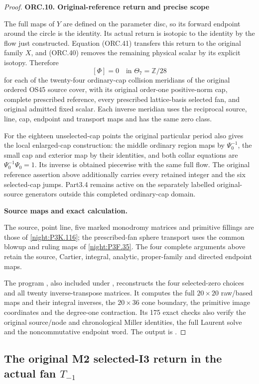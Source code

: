 \begin{proof}
\par

\medskip\noindent\textbf{ORC.10. Original-reference return and precise scope}

\par\nobreak

The full maps of \(Y\) are defined on the parameter
disc, so its forward endpoint around the circle is
the identity. Its actual return is isotopic to the
identity by the flow just constructed.
Equation (ORC.41) transfers this return to the original
family \(X\), and (ORC.40) removes the remaining
physical scalar by its explicit isotopy. Therefore
\[
[\Phi]=0\quad\text{in }\Theta_7=\mathbb Z/28
\tag{ORC.43}
\]
for each of the twenty-four ordinary-cap collision
meridians of the original ordered OS45 source cover,
with its original order-one positive-norm cap, complete
prescribed reference, every prescribed lattice-basis
selected fan, and original admitted fixed scalar.
Each inverse meridian uses the reciprocal source,
line, cap, endpoint and transport maps and has the
same zero class.

For the eighteen unselected-cap points the original
particular period also gives the local enlarged-cap
construction: the middle ordinary region maps by
\(\Psi_0^{-1}\), the small cap and exterior map by
their identities, and both collar equations are
\(\Psi_0^{-1}\Psi_0=1\). Its inverse is obtained
piecewise with the same full flow. The original
reference assertion above additionally carries every
retained integer and the six selected-cap jumps.
Part3.4 remains active on the separately labelled
original-source generators outside this completed
ordinary-cap domain.




\par\medskip\noindent\textbf{Source maps and exact calculation.}\par
The source, point line, five marked monodromy matrices and primitive
fillings are those of \cref{night:P3K.116}; the prescribed-fan sphere
transport uses the common blowup and ruling maps of \cref{night:P3F.35}.
The four complete arguments above retain the source, Cartier, integral,
analytic, proper-family and directed endpoint maps.

The program
, also
included under , reconstructs the four
selected-zero choices and all twenty inverse-transpose matrices.
It computes the full $20\times20$ raw/based maps and their integral
inverses, the $20\times36$ cone boundary, the primitive image
coordinates and the degree-one contraction. Its 175 exact checks
also verify the original source/node and chronological Miller
identities, the full Laurent solve and the noncommutative endpoint
word. The output is
.


\end{proof}





\subsection{The original M2 selected-I3 return in the actual fan \texorpdfstring{\(T_{-1}\)}{T-1}}
